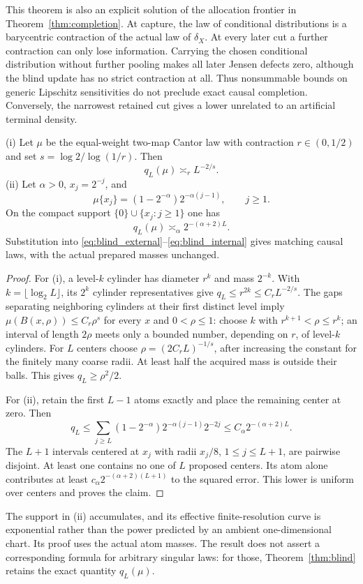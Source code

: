 This theorem is also an explicit solution of the allocation frontier in Theorem~\ref{thm:completion}. At capture, the law of conditional distributions is a barycentric contraction of the actual law of $\delta_X$. At every later cut a further contraction can only lose information. Carrying the chosen conditional distribution without further pooling makes all later Jensen defects zero, although the blind update has no strict contraction at all. Thus nonsummable bounds on generic Lipschitz sensitivities do not preclude exact causal completion. Conversely, the narrowest retained cut gives a lower unrelated to an artificial terminal density.

\begin{corollary}\label{cor:singular_rates}
\textup{(i)} Let $\mu$ be the equal-weight two-map Cantor law with contraction $r\in(0,1/2)$ and set $s=\log2/\log(1/r)$. Then
\[
 q_L(\mu)\asymp_r L^{-2/s}.
\]
\textup{(ii)} Let $\alpha>0$, $x_j=2^{-j}$, and
\[
 \mu\{x_j\}=(1-2^{-\alpha})2^{-\alpha(j-1)},\qquad j\ge1.
\]
On the compact support $\{0\}\cup\{x_j:j\ge1\}$ one has
\[
 q_L(\mu)\asymp_\alpha 2^{-(\alpha+2)L}.
\]
Substitution into \eqref{eq:blind_external}--\eqref{eq:blind_internal} gives matching causal laws, with the actual prepared masses unchanged.
\end{corollary}
\begin{proof}
For (i), a level-$k$ cylinder has diameter $r^k$ and mass $2^{-k}$. With $k=\lfloor\log_2L\rfloor$, its $2^k$ cylinder representatives give $q_L\le r^{2k}\le C_rL^{-2/s}$. The gaps separating neighboring cylinders at their first distinct level imply
$\mu(B(x,\rho))\le C_r\rho^s$ for every $x$ and $0<\rho\le1$: choose $k$ with $r^{k+1}<\rho\le r^k$; an interval of length $2\rho$ meets only a bounded number, depending on $r$, of level-$k$ cylinders. For $L$ centers choose $\rho=(2C_rL)^{-1/s}$, after increasing the constant for the finitely many coarse radii. At least half the acquired mass is outside their balls. This gives $q_L\ge\rho^2/2$.

For (ii), retain the first $L-1$ atoms exactly and place the remaining center at zero. Then
\[
 q_L\le\sum_{j\ge L}(1-2^{-\alpha})2^{-\alpha(j-1)}2^{-2j}
       \le C_\alpha 2^{-(\alpha+2)L}.
\]
The $L+1$ intervals centered at $x_j$ with radii $x_j/8$, $1\le j\le L+1$, are pairwise disjoint. At least one contains no one of $L$ proposed centers. Its atom alone contributes at least
$c_\alpha2^{-(\alpha+2)(L+1)}$ to the squared error. This lower is uniform over centers and proves the claim.
\end{proof}
The support in (ii) accumulates, and its effective finite-resolution curve is exponential rather than the power predicted by an ambient one-dimensional chart. Its proof uses the actual atom masses. The result does not assert a corresponding formula for arbitrary singular laws: for those, Theorem~\ref{thm:blind} retains the exact quantity $q_L(\mu)$.
